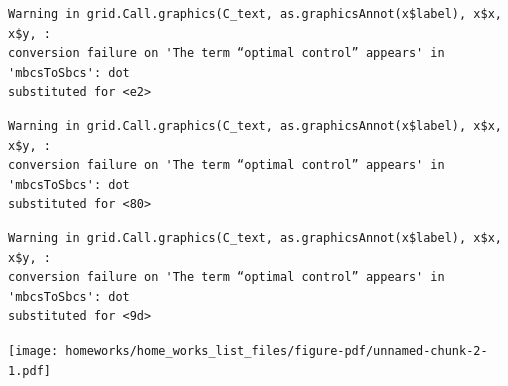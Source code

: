 \documentclass[
  letterpaper,
  DIV=11,
  numbers=noendperiod]{scrreprt}
\theoremstyle{definition}
\theoremstyle{remark}
\begin{document}
\begin{verbatim}
Warning in grid.Call.graphics(C_text, as.graphicsAnnot(x$label), x$x, x$y, :
conversion failure on 'The term “optimal control” appears' in 'mbcsToSbcs': dot
substituted for <e2>
\end{verbatim}

\begin{verbatim}
Warning in grid.Call.graphics(C_text, as.graphicsAnnot(x$label), x$x, x$y, :
conversion failure on 'The term “optimal control” appears' in 'mbcsToSbcs': dot
substituted for <80>
\end{verbatim}

\begin{verbatim}
Warning in grid.Call.graphics(C_text, as.graphicsAnnot(x$label), x$x, x$y, :
conversion failure on 'The term “optimal control” appears' in 'mbcsToSbcs': dot
substituted for <9d>
\end{verbatim}

\texttt{[image: homeworks/home\_works\_list\_files/figure-pdf/unnamed-chunk-2-1.pdf]}
\end{document}
